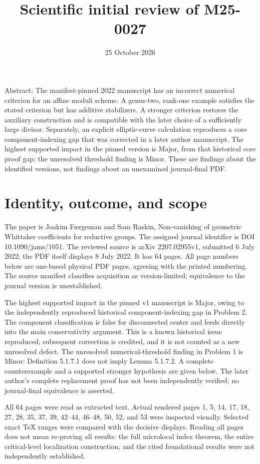 \documentclass[10pt]{article}
\title{Scientific initial review of M25-0027}
\author{}
\date{25 October 2026}
\begin{document}
\maketitle
Abstract: The manifest-pinned 2022 manuscript has an incorrect numerical criterion for an affine moduli scheme. A genus-two, rank-one example satisfies the stated criterion but has additive stabilizers. A stronger criterion restores the auxiliary construction and is compatible with the later choice of a sufficiently large divisor. Separately, an explicit elliptic-curve calculation reproduces a core component-indexing gap that was corrected in a later author manuscript. The highest supported impact in the pinned version is Major, from that historical core proof gap; the unresolved threshold finding is Minor. These are findings about the identified versions, not findings about an unexamined journal-final PDF.\par
\section*{Identity, outcome, and scope}
The paper is Joakim Færgeman and Sam Raskin, Non-vanishing of geometric Whittaker coefficients for reductive groups. The assigned journal identifier is DOI 10.1090/jams/1051. The reviewed source is arXiv 2207.02955v1, submitted 6 July 2022; the PDF itself displays 8 July 2022. It has 64 pages. All page numbers below are one-based physical PDF pages, agreeing with the printed numbering. The source manifest classifies acquisition as version-limited; equivalence to the journal version is unestablished.\par
The highest supported impact in the pinned v1 manuscript is Major, owing to the independently reproduced historical component-indexing gap in Problem 2. The component classification is false for disconnected center and feeds directly into the main conservativity argument. This is a known historical issue reproduced; subsequent correction is credited, and it is not counted as a new unresolved defect. The unresolved numerical-threshold finding in Problem 1 is Minor: Definition 5.1.7.1 does not imply Lemma 5.1.7.2. A complete counterexample and a supported stronger hypothesis are given below. The later author’s complete replacement proof has not been independently verified; no journal-final equivalence is asserted.\par
All 64 pages were read as extracted text. Actual rendered pages 1, 5, 14, 17, 18, 27, 28, 35, 37, 39, 42–44, 46–48, 50, 52, and 53 were inspected visually. Selected exact TeX ranges were compared with the decisive displays. Reading all pages does not mean re-proving all results: the full microlocal index theorem, the entire critical-level localization construction, and the cited foundational results were not independently established.\par
\end{document}

